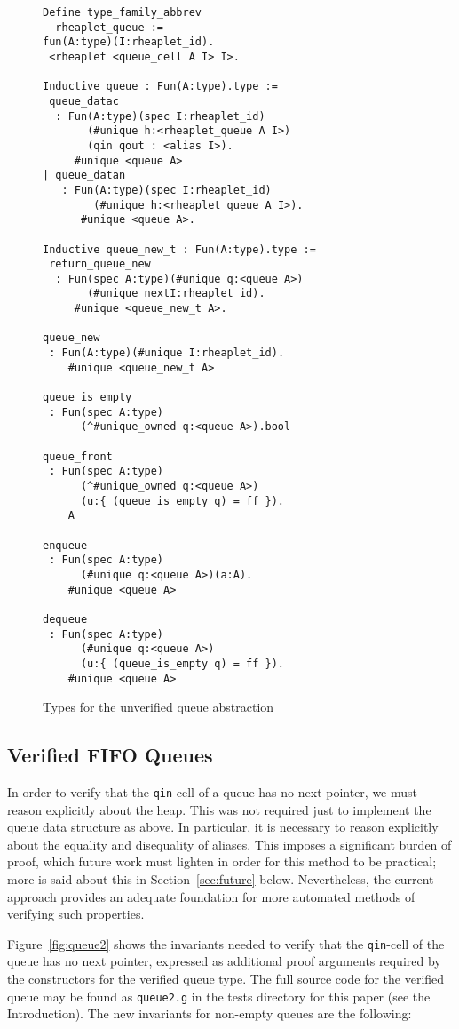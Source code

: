 \documentclass[9pt,natbib]{sigplanconf}
\begin{document}
\begin{figure}
\small
\begin{verbatim}
Define type_family_abbrev
  rheaplet_queue := 
fun(A:type)(I:rheaplet_id).
 <rheaplet <queue_cell A I> I>.

Inductive queue : Fun(A:type).type :=
 queue_datac
  : Fun(A:type)(spec I:rheaplet_id)
       (#unique h:<rheaplet_queue A I>)
       (qin qout : <alias I>).
     #unique <queue A>
| queue_datan
   : Fun(A:type)(spec I:rheaplet_id)
        (#unique h:<rheaplet_queue A I>).
      #unique <queue A>.

Inductive queue_new_t : Fun(A:type).type :=
 return_queue_new
  : Fun(spec A:type)(#unique q:<queue A>)
       (#unique nextI:rheaplet_id).
     #unique <queue_new_t A>.

queue_new
 : Fun(A:type)(#unique I:rheaplet_id).
    #unique <queue_new_t A>

queue_is_empty
 : Fun(spec A:type)
      (^#unique_owned q:<queue A>).bool

queue_front
 : Fun(spec A:type)
      (^#unique_owned q:<queue A>)
      (u:{ (queue_is_empty q) = ff }).
    A 
 
enqueue
 : Fun(spec A:type)
      (#unique q:<queue A>)(a:A).
    #unique <queue A> 

dequeue
 : Fun(spec A:type)
      (#unique q:<queue A>)
      (u:{ (queue_is_empty q) = ff }).
    #unique <queue A>
\end{verbatim}
\caption{Types for the unverified queue abstraction}
\label{fig:queue}
\end{figure}

\subsection{Verified FIFO Queues}

In order to verify that the \texttt{qin}-cell of a queue has no next
pointer, we must reason explicitly about the heap.  This was not
required just to implement the queue data structure as above.  In
particular, it is necessary to reason explicitly about the equality
and disequality of aliases.  This imposes a significant burden of
proof, which future work must lighten in order for this method to be
practical; more is said about this in Section~\ref{sec:future} below.
Nevertheless, the current approach provides an adequate foundation for
more automated methods of verifying such properties.

Figure~\ref{fig:queue2} shows the invariants needed to verify that the
\texttt{qin}-cell of the queue has no next pointer, expressed as
additional proof arguments required by the constructors for the
verified queue type.  The full source code for the verified queue may
be found as \texttt{queue2.g} in the tests directory for this paper
(see the Introduction).  The new invariants for non-empty queues are
the following:
\end{document}
